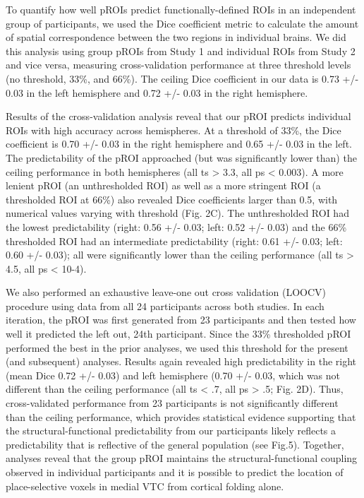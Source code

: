%
To quantify how well pROIs predict functionally-defined ROIs in an independent
group of participants, we used the Dice coefficient metric to calculate the
amount of spatial correspondence between the two regions in individual brains.
%
We did this analysis using group pROIs from Study 1 and individual ROIs from
Study 2 and vice versa, measuring cross-validation performance at three
threshold levels (no threshold, 33\%, and 66\%).
%
The ceiling Dice coefficient in our data is 0.73 +/- 0.03 in the left hemisphere
and 0.72 +/- 0.03 in the right hemisphere.

%
Results of the cross-validation analysis reveal that our pROI predicts
individual ROIs with high accuracy across hemispheres.
%
At a threshold of 33\%, the Dice coefficient is 0.70 +/- 0.03 in the right
hemisphere and 0.65 +/- 0.03 in the left.
%
The predictability of the pROI approached (but was significantly lower than) the
ceiling performance in both hemispheres (all ts > 3.3, all ps < 0.003).
%
A more lenient pROI (an unthresholded ROI) as well as a more stringent ROI (a
thresholded ROI at 66\%) also revealed Dice coefficients larger than 0.5, with
numerical values varying with threshold (Fig. 2C).
%
The unthresholded ROI had the lowest predictability (right: 0.56 +/- 0.03; left:
0.52 +/- 0.03) and the 66\% thresholded ROI had an intermediate predictability
(right: 0.61 +/- 0.03; left: 0.60 +/- 0.03); all were significantly lower than
the ceiling performance (all ts > 4.5, all ps < 10-4).


We also performed an exhaustive leave-one out cross validation (LOOCV) procedure
using data from all 24 participants across both studies.
%
In each iteration, the pROI was first generated from 23 participants and then
tested how well it predicted the left out, 24th participant.
%
Since the 33\% thresholded pROI performed the best in the prior analyses, we
used this threshold for the present (and subsequent) analyses.
%
Results again revealed high predictability in the right (mean Dice 0.72 +/-
0.03) and left hemisphere (0.70 +/- 0.03, which was not different than the
ceiling performance (all ts < .7, all ps > .5; Fig. 2D).
%
Thus, cross-validated performance from 23 participants is not significantly
different than the ceiling performance, which provides statistical evidence
supporting that the structural-functional predictability from our participants
likely reflects a predictability that is reflective of the general population
(see Fig.5).
%
Together, analyses reveal that the group pROI maintains the
structural-functional coupling observed in individual participants and it is
possible to predict the location of place-selective voxels in medial VTC from
cortical folding alone.

